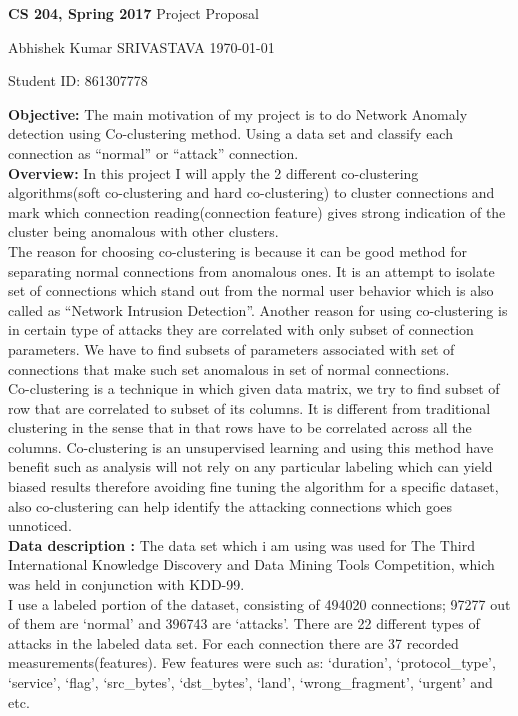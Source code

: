 \documentclass[a4paper,11pt]{article}
\renewcommand{\maketitle}{%
	
	\Large
 	\textbf{CS 204, Spring 2017}
 	\hfill
 	Project Proposal
 	\par
 	
	\Large
	Abhishek Kumar SRIVASTAVA
	\hfill
	\normalsize
	\today
 	\par
 	Student ID: 861307778
 	\par
 	

 	

 	
 	\hrulefill
 	\par \vspace{2ex}
 	}
\theoremstyle{quest}
\begin{document}
\thispagestyle{empty}
	
\maketitle

\textbf{Objective:} The main motivation of my project is to do Network Anomaly detection using Co-clustering method. Using a data set and classify each connection as ``normal'' or ``attack'' connection.\\

\textbf{Overview: } In this project I will apply the 2 different co-clustering algorithms(soft co-clustering and hard co-clustering) to cluster connections and mark which connection reading(connection feature) gives strong indication of the cluster being anomalous with other clusters.\\

The reason for choosing co-clustering is because it can be good method for separating normal connections from anomalous ones. It is an attempt to isolate set of connections which stand out from the normal user behavior which is also called as ``Network Intrusion Detection''. Another reason for using co-clustering is in certain type of attacks they are correlated with only subset of connection parameters. We have to find subsets of parameters associated with set of connections that make such set anomalous in set of normal connections.\\

Co-clustering is a technique in which given data matrix, we try to find subset of row that are correlated to subset of its columns. It is different from traditional clustering in the sense that in that rows have to be correlated across all the columns. Co-clustering is an unsupervised learning and using this method have benefit such as analysis will not rely on any particular labeling which can yield biased results therefore avoiding fine tuning the algorithm for a specific dataset, also co-clustering can help identify the  attacking connections which goes unnoticed.\\

\textbf{Data description :} 
The data set which i am using was used for The Third International Knowledge Discovery and Data Mining Tools Competition, which was held in conjunction with KDD-99.\\

I use a labeled portion of the dataset, consisting of 494020 connections; 97277 out of them are `normal' and 396743 are `attacks'. There are 22 different types of attacks in the labeled data set. For each connection there are 37 recorded measurements(features). Few features were such as: `duration', `protocol\_type', `service', `flag', `src\_bytes', `dst\_bytes', `land', `wrong\_fragment', `urgent' and etc.\\
\end{document}
